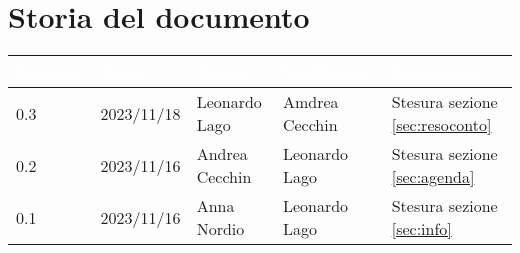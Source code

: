 \section{Storia del documento} \label{sec:storia}
\begingroup
\setlength{\tabcolsep}{10pt}
\renewcommand{\arraystretch}{1.5}
\begin{tabularx}{\textwidth}{| l | l | X | X | X |}
    \hline
    \rowcolor{headerrow} \textbf{\textcolor{white}{Versione}} & \textbf{\textcolor{white}{Data}} & \textbf{\textcolor{white}{Autori}} & \textbf{\textcolor{white}{Verificatori}} & \textbf{\textcolor{white}{Descrizione}} \\
    \hline
    0.3 & 2023/11/18 & Leonardo Lago & Amdrea Cecchin & Stesura sezione \ref{sec:resoconto}\\
    \hline
    0.2 & 2023/11/16 & Andrea Cecchin & Leonardo Lago & Stesura sezione \ref{sec:agenda}\\
    \hline
    0.1 & 2023/11/16 & Anna Nordio & Leonardo Lago & Stesura sezione \ref{sec:info}\\
    \hline
\end{tabularx}
\endgroup
